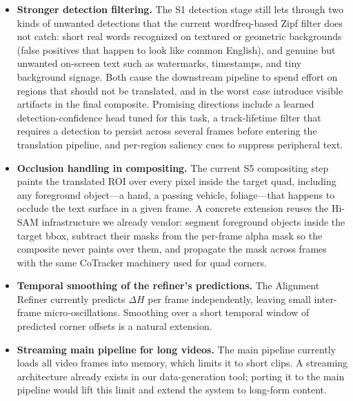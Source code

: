 \begin{itemize}[leftmargin=*]
  \item \textbf{Stronger detection filtering.} The S1 detection
    stage still lets through two kinds of unwanted detections that
    the current wordfreq-based Zipf filter does not catch:
    short real words recognized on textured or geometric
    backgrounds (false positives that happen to look like common
    English), and genuine but unwanted on-screen text such as
    watermarks, timestamps, and tiny background signage. Both
    cause the downstream pipeline to spend effort on regions that
    should not be translated, and in the worst case introduce
    visible artifacts in the final composite. Promising directions
    include a learned detection-confidence head tuned for this
    task, a track-lifetime filter that requires a detection to
    persist across several frames before entering the translation
    pipeline, and per-region saliency cues to suppress
    peripheral text.
  \item \textbf{Occlusion handling in compositing.} The current
    S5 compositing step paints the translated ROI over every pixel
    inside the target quad, including any foreground object---a
    hand, a passing vehicle, foliage---that happens to occlude the
    text surface in a given frame. A concrete extension reuses the
    Hi-SAM infrastructure we already vendor: segment foreground
    objects inside the target bbox, subtract their masks from the
    per-frame alpha mask so the composite never paints over them,
    and propagate the mask across frames with the same CoTracker
    machinery used for quad corners.
  \item \textbf{Temporal smoothing of the refiner's predictions.}
    The Alignment Refiner currently predicts $\Delta H$ per frame
    independently, leaving small inter-frame micro-oscillations.
    Smoothing over a short temporal window of predicted corner
    offsets is a natural extension.
  \item \textbf{Streaming main pipeline for long videos.} The main
    pipeline currently loads all video frames into memory, which
    limits it to short clips. A streaming architecture already
    exists in our data-generation tool; porting it to the main
    pipeline would lift this limit and extend the system to
    long-form content.
\end{itemize}
